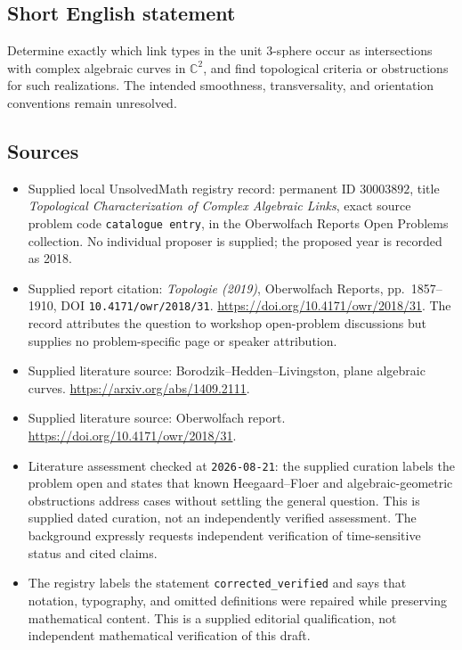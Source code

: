 \documentclass[11pt]{article}
\newcommand{\C}{\mathbb{C}}
\begin{document}
\subsection{Short English statement}
Determine exactly which link types in the unit \(3\)-sphere occur as intersections with complex algebraic curves in \(\C^2\), and find topological criteria or obstructions for such realizations. The intended smoothness, transversality, and orientation conventions remain unresolved.
\subsection{Sources}
\begin{itemize}
\item Supplied local UnsolvedMath registry record: permanent ID \(30003892\), title \emph{Topological Characterization of Complex Algebraic Links}, exact source problem code \texttt{catalogue entry}, in the Oberwolfach Reports Open Problems collection. No individual proposer is supplied; the proposed year is recorded as 2018.
\item Supplied report citation: \emph{Topologie (2019)}, Oberwolfach Reports, pp.\ 1857--1910, DOI \texttt{10.4171/owr/2018/31}. \url{https://doi.org/10.4171/owr/2018/31}. The record attributes the question to workshop open-problem discussions but supplies no problem-specific page or speaker attribution.
\item Supplied literature source: Borodzik--Hedden--Livingston, plane algebraic curves. \url{https://arxiv.org/abs/1409.2111}.
\item Supplied literature source: Oberwolfach report. \url{https://doi.org/10.4171/owr/2018/31}.
\item Literature assessment checked at \texttt{2026-08-21}: the supplied curation labels the problem open and states that known Heegaard--Floer and algebraic-geometric obstructions address cases without settling the general question. This is supplied dated curation, not an independently verified assessment. The background expressly requests independent verification of time-sensitive status and cited claims.
\item The registry labels the statement \texttt{corrected\_verified} and says that notation, typography, and omitted definitions were repaired while preserving mathematical content. This is a supplied editorial qualification, not independent mathematical verification of this draft.
\end{itemize}
\end{document}
